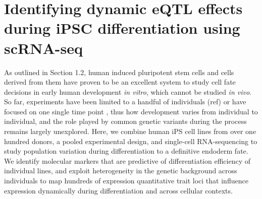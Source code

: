 
\chapter{Identifying dynamic eQTL effects during iPSC differentiation using scRNA-seq}

As outlined in Section 1.2, human induced pluripotent stem cells and cells derived from them have proven to be an excellent system to study cell fate decisions in early human development \textit{in vitro}, which cannot be studied \textit{in vivo}.
So far, experiments have been limited to a handful of individuals (ref) or have focused on one single time point \cite{kilpinen2017common, schwartzentruber2018molecular}, thus how development varies from individual to individual, and the role played by common genetic variants during the process remains largely unexplored.
Here, we combine human iPS cell lines from over one hundred donors, a pooled experimental design, and single-cell RNA-sequencing to study population variation during differentiation to a definitive endoderm fate. 
We identify molecular markers that are predictive of differentiation efficiency of individual lines, and exploit heterogeneity in the genetic background across individuals to map hundreds of expression quantitative trait loci that influence expression dynamically during differentiation and across cellular contexts.\\

\newpage

